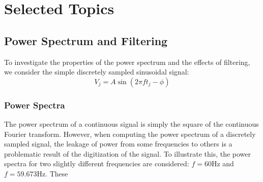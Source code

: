 \documentclass[11pt, letterpage, twocolumn]{article}
\begin{document}
\section{Selected Topics}
\subsection{Power Spectrum and Filtering}
To investigate the properties of the power spectrum and the effects of
filtering, we consider the simple discretely sampled sinusoidal signal:
\begin{equation}
  V_j = A \sin(2 \pi f t_j - \phi)
  \label{eq:sine}
\end{equation}


\subsubsection{Power Spectra}
The power spectrum of a continuous signal is simply the square of the continuous
Fourier transform. However, when computing the power spectrum of a discretely
sampled signal, the leakage of power from some frequencies to others is a
problematic result of the digitization of the signal. To illustrate this, the
power spectra for two slightly different frequencies are considered: $f = 60$Hz
and $f = 59.673$Hz. These 
\end{document}
